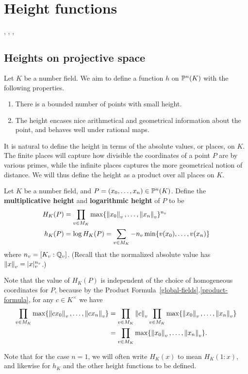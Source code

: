 \chapter{Height functions}\label{height-functions}
\cite{Ko84}, \cite{Si86}, \cite{HS00}, \cite{Si07}
\section{Heights on projective space}
Let $K$ be a number field. We aim to define a function $h$ on $\mathbb{P}^n(K)$ with the following properties.
\begin{enumerate}
\item There is a bounded number of points with small height. 
\item The height encases nice arithmetical and geometrical information about the point, and behaves well under rational maps.
\end{enumerate}
It is natural to define the height in terms of the absolute values, or places, on $K$. The finite places will capture how divisible the coordinates of a point $P$ are by various primes, while the infinite places captures the more geometrical notion of distance. 
We will thus define the height as a product over all places on $K$.
\begin{df}
Let $K$ be a number field, and $P=(x_0,\ldots, x_n)\in \mathbb{P}^n(K)$. Define the \textbf{multiplicative height} and \textbf{logarithmic height} of $P$ to be
\begin{align*}
H_K(P)&=\prod_{v\in M_K} \max\{\left\Vert {x_0}\right\Vert_v,\ldots, \left\Vert {x_n}\right\Vert_v\}^{n_v}\\
h_K(P)&=\log H_K(P)=\sum_{v\in M_K} -n_v\min\{v(x_0),\ldots, v(x_n)\}
\end{align*}
where $n_v=[K_v:\mathbb{Q}_v]$. (Recall that the normalized absolute value has $\left\Vert {x}\right\Vert_v=|x|_v^{n_v}$.)
\end{df}
Note that the value of $H_K(P)$ is independent of the choice of homogeneous coordinates for $P$, because by the Product Formula~\ref{global-fields}.\ref{product-formula}, for any $c\in K^{\times}$ we have
\begin{align*}
\prod_{v\in M_K} \max\{\left\Vert {cx_0}\right\Vert_v,\ldots, \left\Vert {cx_n}\right\Vert_v\}
&=
\prod_{v\in M_K} \left\Vert {c}\right\Vert_v\prod_{v\in M_K} \max\{\left\Vert {x_0}\right\Vert_v,\ldots, \left\Vert {x_n}\right\Vert_v\}\\
&=\prod_{v\in M_K} \max\{\left\Vert {x_0}\right\Vert_v,\ldots, \left\Vert {x_n}\right\Vert_v\}.
\end{align*}

Note that for the case $n=1$, we will often write $H_K(x)$ to mean $H_K(1:x)$, and likewise for $h_K$ and the other height functions to be defined.

